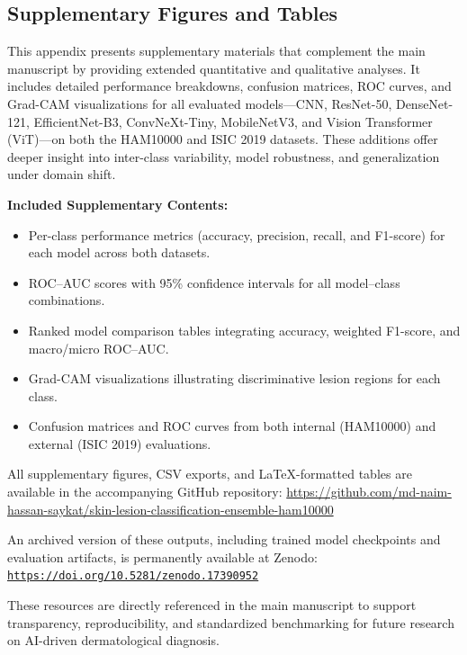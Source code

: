 \documentclass[pdflatex,sn-mathphys-num]{sn-jnl}%
\theoremstyle{thmstyleone}%
\theoremstyle{thmstyletwo}%
\theoremstyle{thmstylethree}%
\begin{document}
\begin{appendices}

\section{Supplementary Figures and Tables}\label{secA1}

\noindent
This appendix presents supplementary materials that complement the main manuscript by providing extended quantitative and qualitative analyses. It includes detailed performance breakdowns, confusion matrices, ROC curves, and Grad-CAM visualizations for all evaluated models—CNN, ResNet-50, DenseNet-121, EfficientNet-B3, ConvNeXt-Tiny, MobileNetV3, and Vision Transformer (ViT)—on both the HAM10000 and ISIC 2019 datasets. These additions offer deeper insight into inter-class variability, model robustness, and generalization under domain shift.

\bigskip
\noindent
\textbf{Included Supplementary Contents:}
\begin{itemize}
    \item Per-class performance metrics (accuracy, precision, recall, and F1-score) for each model across both datasets.
    \item ROC–AUC scores with 95\% confidence intervals for all model–class combinations.
    \item Ranked model comparison tables integrating accuracy, weighted F1-score, and macro/micro ROC–AUC.
    \item Grad-CAM visualizations illustrating discriminative lesion regions for each class.
    \item Confusion matrices and ROC curves from both internal (HAM10000) and external (ISIC 2019) evaluations.
\end{itemize}

\bigskip
\noindent
All supplementary figures, CSV exports, and LaTeX-formatted tables are available in the accompanying GitHub repository:  
\url{https://github.com/md-naim-hassan-saykat/skin-lesion-classification-ensemble-ham10000}

\noindent
An archived version of these outputs, including trained model checkpoints and evaluation artifacts, is permanently available at Zenodo:  
\href{https://doi.org/10.5281/zenodo.17390952}{\texttt{https://doi.org/10.5281/zenodo.17390952}}

\noindent
These resources are directly referenced in the main manuscript to support transparency, reproducibility, and standardized benchmarking for future research on AI-driven dermatological diagnosis.

\end{appendices}


\end{document}
